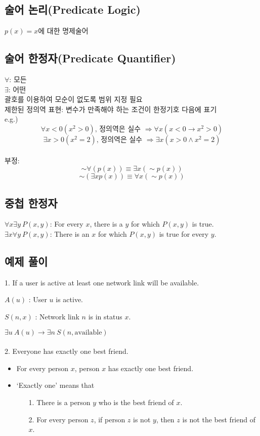 \subsection{술어 논리(Predicate Logic)}
$p(x)=x$에 대한 명제술어
\subsection{술어 한정자(Predicate Quantifier)}
$\forall$: 모든\\
$\exists$: 어떤\\
괄호를 이용하여 모순이 없도록 범위 지정 필요\\
제한된 정의역 표현: 변수가 만족해야 하는 조건이 한정기호 다음에 표기\\
e.g.) $$\forall x<0(x^2>0)\text{, 정의역은 실수 }\Longrightarrow \forall x (x < 0 \rightarrow x^2>0)$$
$$\exists x>0(x^2=2)\text{, 정의역은 실수 }\Longrightarrow \exists x(x>0 \land x^2=2)$$
\\
부정:
$$\sim \forall(p(x)) \equiv \exists x(\sim p(x))$$
$$\sim (\exists x p(x)) \equiv \forall x(\sim p(x))$$

\subsection{중첩 한정자}
$\forall x \exists y\ P(x, y)$: For every $x$, there is a $y$ for which $P(x, y)$ is true.\\
$\exists x \forall y\ P(x, y)$: There is an $x$ for which $P(x, y)$ is true for every $y$.

\subsection{예제 풀이}
1. If a user is active at least one network link will be available.

$A(u)$ : User $u$ is active.

$S(n, x)$ : Network link $n$ is in status $x$.

$\exists u\ A(u) \to \exists n\ S(n, \text{available})$\\\\
2. Everyone has exactly one best friend.
\begin{itemize}[label=$\to$]
    \item For every person $x$, person $x$ has exactly one best friend.
    \item `Exactly one' means that
    \begin{itemize}
        \item[1.] There is a person $y$ who is the best friend of $x$.
        \item[2.] For every person $z$, if person $z$ is not $y$, then $z$ is not the best friend of $x$.
    \end{itemize}
\end{itemize}

